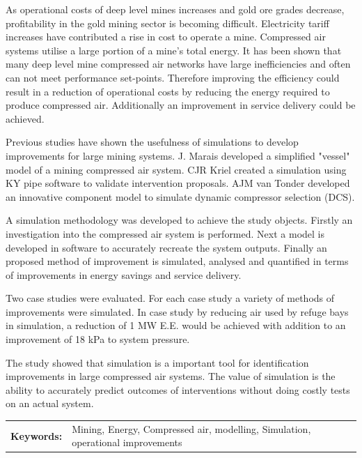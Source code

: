 \documentclass[12pt, english, oneside, open=any]{report}
\begin{document}
	 As operational costs of deep level mines increases and gold ore grades decrease, profitability in the gold mining sector is becoming difficult. Electricity tariff increases have contributed a rise in cost to operate a mine.  Compressed air systems utilise a large portion of a mine's total energy. It has been shown that many deep level mine compressed air networks have large inefficiencies and often can not meet performance set-points. Therefore improving the efficiency could result in a reduction of operational costs by reducing the energy required to produce compressed air. Additionally an improvement in service delivery could be achieved. \par
	Previous studies have shown the usefulness of simulations to develop improvements for large mining systems.  J. Marais developed  a simplified "vessel" model of a mining compressed air system. CJR Kriel created a simulation using KY pipe software to validate intervention proposals. AJM van Tonder developed an innovative component model to simulate dynamic compressor  selection (DCS). \par
	A simulation methodology was developed to achieve the study objects. Firstly an investigation into the compressed air system is performed. Next a model is developed in software to accurately recreate the system outputs. Finally an proposed method of improvement is simulated, analysed and quantified in terms of improvements in energy savings and service delivery.\par
	 Two case studies were evaluated. For each case study a variety of methods of improvements were simulated. In case study by reducing air used by refuge bays in simulation, a reduction of 1 MW E.E. would be achieved with addition to an improvement of 18 kPa to system pressure.\par
	 The study showed that simulation is a important tool for identification improvements in large compressed air systems. The value of simulation is the ability to accurately predict outcomes of interventions without doing costly tests on an actual system. \\
	 \vspace{2cm}
	\begin{tabular}{p{2.35cm}p{13.35cm}}
		\textbf{Keywords:} & Mining, Energy, Compressed air, modelling, Simulation, operational improvements  \\
	\end{tabular}
\clearpage

\setcounter{page}{3}
\singlespacing
\tableofcontents
{}
\doublespacing
\end{document}
